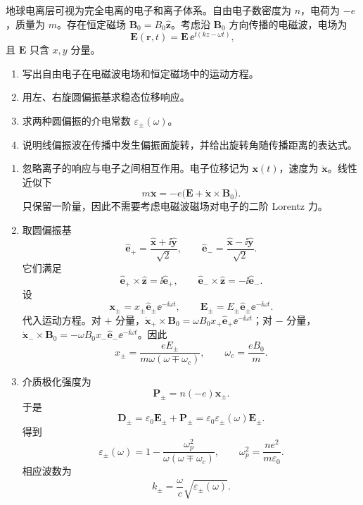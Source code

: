 \begin{question}
地球电离层可视为完全电离的电子和离子体系。自由电子数密度为 $n$，电荷为 $-e$，质量为 $m$。存在恒定磁场 $\mathbf B_0=B_0\hat{\mathbf z}$。考虑沿 $\mathbf B_0$ 方向传播的电磁波，电场为
\[
    \mathbf E(\mathbf r,t)=\mathbf E\,\ee^{\ii(kz-\omega t)},
\]
且 $\mathbf E$ 只含 $x,y$ 分量。
\begin{enumerate}
  \item 写出自由电子在电磁波电场和恒定磁场中的运动方程。
  \item 用左、右旋圆偏振基求稳态位移响应。
  \item 求两种圆偏振的介电常数 $\varepsilon_\pm(\omega)$。
  \item 说明线偏振波在传播中发生偏振面旋转，并给出旋转角随传播距离的表达式。
\end{enumerate}
\begin{solution}
\begin{enumerate}
  \item 忽略离子的响应与电子之间相互作用。电子位移记为 $\mathbf x(t)$，速度为 $\dot{\mathbf x}$。线性近似下
  \[
    m\ddot{\mathbf x}=-e\bigl(\mathbf E+\dot{\mathbf x}\times\mathbf B_0\bigr) .
  \]
  只保留一阶量，因此不需要考虑电磁波磁场对电子的二阶 Lorentz 力。

  \item 取圆偏振基
  \[
    \hat{\mathbf e}_+=\frac{\hat{\mathbf x}+\ii\hat{\mathbf y}}{\sqrt2},
    \qquad
    \hat{\mathbf e}_-=\frac{\hat{\mathbf x}-\ii\hat{\mathbf y}}{\sqrt2} .
  \]
  它们满足
  \[
    \hat{\mathbf e}_+\times\hat{\mathbf z}=\ii\hat{\mathbf e}_+,
    \qquad
    \hat{\mathbf e}_-\times\hat{\mathbf z}=-\ii\hat{\mathbf e}_- .
  \]
  设
  \[
    \mathbf x_\pm=x_\pm\hat{\mathbf e}_\pm\ee^{-\ii\omega t},
    \qquad
    \mathbf E_\pm=E_\pm\hat{\mathbf e}_\pm\ee^{-\ii\omega t} .
  \]
  代入运动方程。对 $+$ 分量，$\dot{\mathbf x}_+\times\mathbf B_0=\omega B_0x_+\hat{\mathbf e}_+\ee^{-\ii\omega t}$；对 $-$ 分量，$\dot{\mathbf x}_-\times\mathbf B_0=-\omega B_0x_-\hat{\mathbf e}_-\ee^{-\ii\omega t}$。因此
  \[
    x_\pm=\frac{eE_\pm}{m\omega(\omega\mp\omega_c)},
    \qquad
    \omega_c=\frac{eB_0}{m} .
  \]

  \item 介质极化强度为
  \[
    \mathbf P_\pm=n(-e)\mathbf x_\pm .
  \]
  于是
  \[
    \mathbf D_\pm=\varepsilon_0\mathbf E_\pm+\mathbf P_\pm
    =\varepsilon_0\varepsilon_\pm(\omega)\mathbf E_\pm .
  \]
  得到
  \[
    \boxed{\varepsilon_\pm(\omega)
    =1-\frac{\omega_p^2}{\omega(\omega\mp\omega_c)}} ,
    \qquad
    \omega_p^2=\frac{ne^2}{m\varepsilon_0} .
  \]
  相应波数为
  \[
    k_\pm=\frac{\omega}{c}\sqrt{\varepsilon_\pm(\omega)} .
  \]


\end{enumerate}
\end{solution}
\end{question}
